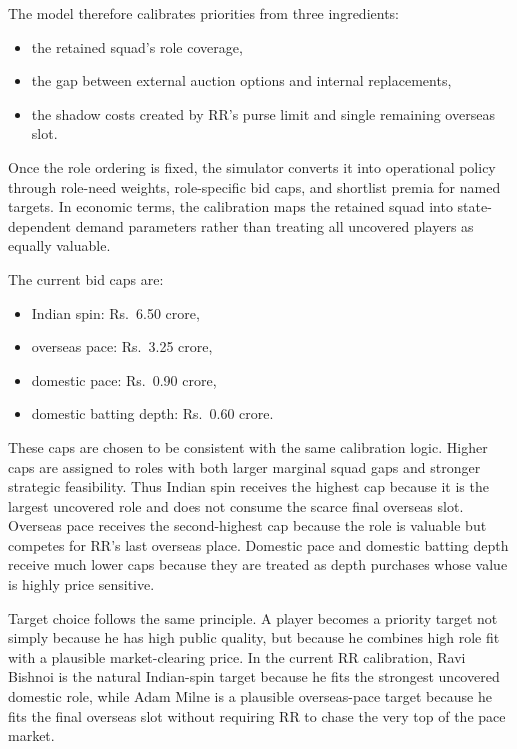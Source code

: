 \documentclass[11pt]{article}
\begin{document}
The model therefore calibrates priorities from three ingredients:
\begin{itemize}[leftmargin=1.5em]
    \item the retained squad's role coverage,
    \item the gap between external auction options and internal replacements,
    \item the shadow costs created by RR's purse limit and single remaining overseas slot.
\end{itemize}

Once the role ordering is fixed, the simulator converts it into operational policy through role-need weights, role-specific bid caps, and shortlist premia for named targets. In economic terms, the calibration maps the retained squad into state-dependent demand parameters rather than treating all uncovered players as equally valuable.

The current bid caps are:
\begin{itemize}[leftmargin=1.5em]
    \item Indian spin: Rs.\ 6.50 crore,
    \item overseas pace: Rs.\ 3.25 crore,
    \item domestic pace: Rs.\ 0.90 crore,
    \item domestic batting depth: Rs.\ 0.60 crore.
\end{itemize}

These caps are chosen to be consistent with the same calibration logic. Higher caps are assigned to roles with both larger marginal squad gaps and stronger strategic feasibility. Thus Indian spin receives the highest cap because it is the largest uncovered role and does not consume the scarce final overseas slot. Overseas pace receives the second-highest cap because the role is valuable but competes for RR's last overseas place. Domestic pace and domestic batting depth receive much lower caps because they are treated as depth purchases whose value is highly price sensitive.

Target choice follows the same principle. A player becomes a priority target not simply because he has high public quality, but because he combines high role fit with a plausible market-clearing price. In the current RR calibration, Ravi Bishnoi is the natural Indian-spin target because he fits the strongest uncovered domestic role, while Adam Milne is a plausible overseas-pace target because he fits the final overseas slot without requiring RR to chase the very top of the pace market.
\end{document}
